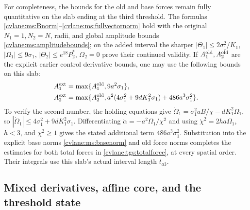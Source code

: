 For completeness, the bounds for the old and base forces remain
fully quantitative on the slab ending at the third threshold. The formulas
\eqref{cvlane:ms:Bnorm}--\eqref{cvlane:ms:fullvectornorm} hold with the original
$N_1=1,N_2=N$, radii, and global amplitude bounds
\eqref{cvlane:ms:amplitudebounds}; on the added interval the sharper
$|\Theta_1|\leq2\sigma_1^2/K_1$, $|\Omega_1|\leq9\sigma_1$,
$|\Theta_2|\leq e^{18}P_2^*$, $\Omega_2=0$ prove their continued
validity. If $A_1^{\rm old},A_2^{\rm old}$ are the explicit earlier
control derivative bounds, one may use the following bounds on this slab:
\begin{equation}\label{cvlane:tgs:oldcontrolbounds}
 \begin{split}
 A_1^{\rm ext}&=\max\{A_1^{\rm old},9a^2\sigma_1\},\\
 A_2^{\rm ext}&=\max\{A_2^{\rm old},
              a^2(4\sigma_1^2+9dK_1^2\sigma_1)
                         +486a^3\sigma_1^2\}.
 \end{split}
\end{equation}
To verify the second number, the holding equations give
$\dot\Omega_1=\sigma_1^2aB/\chi-dK_1^2\Omega_1$,
so $|\dot\Omega_1|\leq4\sigma_1^2+9dK_1^2\sigma_1$.
Differentiating $\dot\alpha=-a^2\Omega_1/\chi^2$ and using
$\dot\chi^2=2ha\Omega_1$, $h<3$, and $\chi^2\geq1$
gives the stated additional term $486a^3\sigma_1^2$.
Substitution into the explicit base norms \eqref{cvlane:ms:basenorm}
and old force norms completes the estimates for both total forces
in \eqref{cvlane:tgs:totalforce}, at every spatial order. Their integrals
use this slab's actual interval length $t_{a3}$.

\subsection{Mixed derivatives, affine core, and the threshold state}

